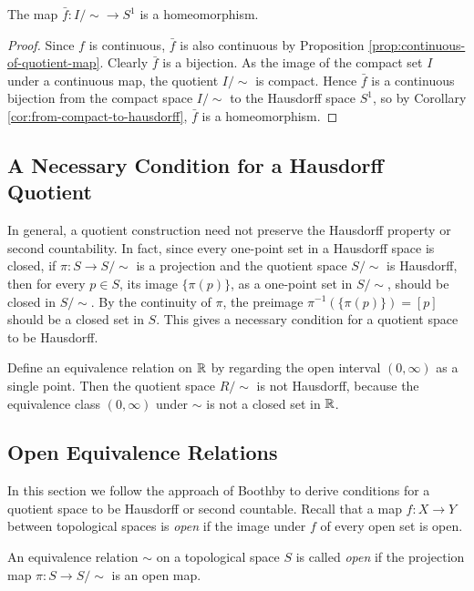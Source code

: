 \begin{proposition}
  \label{prop:interval-to-s1}
	The map $\bar{f}:I/\sim \to S^1$ is a homeomorphism.
\end{proposition}

\begin{proof}
	Since $f$ is continuous, $\bar{f}$ is also continuous by Proposition
	\ref{prop:continuous-of-quotient-map}. Clearly $\bar{f}$ is a bijection.
	As the image of the compact set $I$ under a continuous map, the quotient
	$I/\sim$ is compact. Hence $\bar{f}$ is a continuous bijection from the
	compact space $I/\sim$ to the Hausdorff space $S^1$, so by Corollary
	\ref{cor:from-compact-to-hausdorff}, $\bar{f}$ is a homeomorphism.
\end{proof}


\subsection{A Necessary Condition for a Hausdorff Quotient}

In general, a quotient construction need not preserve the Hausdorff property
or second countability. In fact, since every one-point set in a Hausdorff
space is closed, if $\pi: S\to S/\sim$ is a projection and the quotient space
$S/\sim$ is Hausdorff, then for every $p\in S$, its image $\{\pi(p)\}$, as a
one-point set in $S/\sim$, should be closed in $S/\sim$. By the continuity of
$\pi$, the preimage $\pi^{-1}(\{\pi(p)\})=[p]$ should be a closed set in $S$.
This gives a necessary condition for a quotient space to be Hausdorff.

\begin{example}
	Define an equivalence relation on $\mathbb R$ by regarding the open interval
	$(0,\infty)$ as a single point. Then the quotient space $R/\sim$ is not
	Hausdorff, because the equivalence class $(0,\infty)$ under $\sim$ is
	not a closed set in $\mathbb R$.
\end{example}


\subsection{Open Equivalence Relations}

In this section we follow the approach of Boothby to derive conditions for a
quotient space to be Hausdorff or second countable. Recall that a map $f:X\to
	Y$ between topological spaces is \emph{open} if the image under $f$ of
every open set is open.

\begin{definition}
	An equivalence relation $\sim$ on a topological space $S$ is called
	\emph{open} if the projection map $\pi: S\to S/\sim$ is an open map.
\end{definition}

